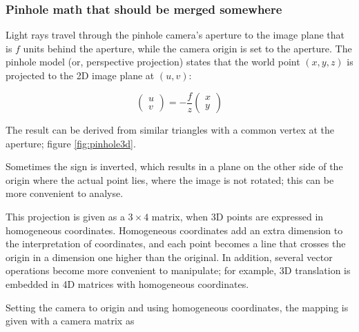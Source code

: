
\subsubsection{Pinhole math that should be merged somewhere} %

Light rays travel through the pinhole camera's aperture to the image plane that is $f$ units behind the aperture, while the camera origin is set to the aperture.
The pinhole model (or, perspective projection) states that the world point $(x, y, z)$ is projected to the 2D image plane at $(u, v)$:

\begin{equation}
\begin{pmatrix}
u \\ v
\end{pmatrix}
=
-\frac{f}{z} \begin{pmatrix}
x \\ y
\end{pmatrix}
\end{equation}

The result can be derived from similar triangles with a common vertex at the aperture; figure \ref{fig:pinhole3d}.

Sometimes the sign is inverted, which results in a plane on the other side of the origin where the actual point lies, where the image is not rotated; this can be more convenient to analyse.
\cite{hartley03multiview}



This projection is given as a $3 \times 4$ matrix, when 3D points are expressed in homogeneous coordinates.
Homogeneous coordinates add an extra dimension to the interpretation of coordinates, and each point becomes a line that crosses the origin in a dimension one higher than the original.
In addition, several vector operations become more convenient to manipulate; for example, 3D translation is embedded in 4D matrices with homogeneous coordinates. \cite{hartley03multiview,heyden2005multiple}

Setting the camera to origin and using homogeneous coordinates, the mapping is given with a camera matrix as

